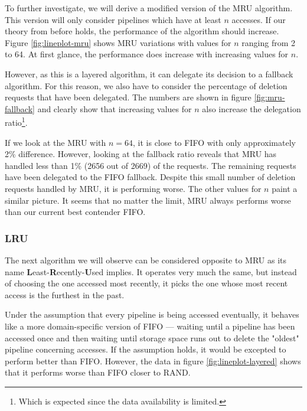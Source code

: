         To further investigate, we will derive a modified version of the MRU algorithm. This version will only consider pipelines which have at least $n$ accesses. If our theory from before holds, the performance of the algorithm should increase. Figure \ref{fig:lineplot-mru} shows MRU variations with values for $n$ ranging from 2 to 64. At first glance, the performance does increase with increasing values for $n$.
        
        
        However, as this is a layered algorithm, it can delegate its decision to a fallback algorithm. For this reason, we also have to consider the percentage of deletion requests that have been delegated. The numbers are shown in figure \ref{fig:mru-fallback} and clearly show that increasing values for $n$ also increase the delegation ratio\footnote{Which is expected since the data availability is limited.}.
        
        
        If we look at the MRU with $n = 64$, it is close to FIFO with only approximately 2\% difference. However, looking at the fallback ratio reveals that MRU has handled less than 1\% (2656 out of 2669) of the requests. The remaining requests have been delegated to the FIFO fallback. Despite this small number of deletion requests handled by MRU, it is performing worse. The other values for $n$ paint a similar picture. It seems that no matter the limit, MRU always performs worse than our current best contender FIFO.
    
    \subsubsection{LRU}
        The next algorithm we will observe can be considered opposite to MRU as its name \textbf{L}east-\textbf{R}ecently-\textbf{U}sed implies. It operates very much the same, but instead of choosing the one accessed most recently, it picks the one whose most recent access is the furthest in the past.
        
        Under the assumption that every pipeline is being accessed eventually, it behaves like a more domain-specific version of FIFO — waiting until a pipeline has been accessed once and then waiting until storage space runs out to delete the "oldest" pipeline concerning accesses. If the assumption holds, it would be excepted to perform better than FIFO. However, the data in figure \ref{fig:lineplot-layered} shows that it performs worse than FIFO closer to RAND.
        
